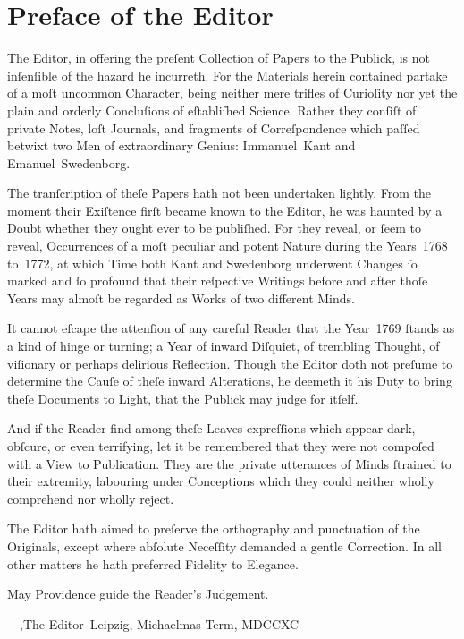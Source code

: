 \documentclass[12pt]{book}
\begin{document}
\chapter*{Preface of the Editor}

The Editor, in offering the preſent Collection of Papers to the Publick, is not inſenſible of the hazard he incurreth. For the Materials herein contained partake of a moſt uncommon Character, being neither mere trifles of Curioſity nor yet the plain and orderly Concluſions of eſtabliſhed Science. Rather they conſiſt of private Notes, loſt Journals, and fragments of Correſpondence which paſſed betwixt two Men of extraordinary Genius: Immanuel~Kant and Emanuel~Swedenborg.

The tranſcription of theſe Papers hath not been undertaken lightly. From the moment their Exiſtence firſt became known to the Editor, he was haunted by a Doubt whether they ought ever to be publiſhed. For they reveal, or ſeem to reveal, Occurrences of a moſt peculiar and potent Nature during the Years~1768 to~1772, at which Time both Kant and Swedenborg underwent Changes ſo marked and ſo profound that their reſpective Writings before and after thoſe Years may almoſt be regarded as Works of two different Minds.

It cannot eſcape the attenſion of any careful Reader that the Year~1769 ſtands as a kind of hinge or turning; a Year of inward Diſquiet, of trembling Thought, of viſionary or perhaps delirious Reflection. Though the Editor doth not preſume to determine the Cauſe of theſe inward Alterations, he deemeth it his Duty to bring theſe Documents to Light, that the Publick may judge for itſelf.

And if the Reader find among theſe Leaves expreſſions which appear dark, obſcure, or even terrifying, let it be remembered that they were not compoſed with a View to Publication. They are the private utterances of Minds ſtrained to their extremity, labouring under Conceptions which they could neither wholly comprehend nor wholly reject.

The Editor hath aimed to preſerve the orthography and punctuation of the Originals, except where abſolute Neceſſity demanded a gentle Correction. In all other matters he hath preferred Fidelity to Elegance.

May Providence guide the Reader’s Judgement.

\hfill ---,The Editor\
\hfill Leipzig, Michaelmas Term, MDCCXC

\end{document}
